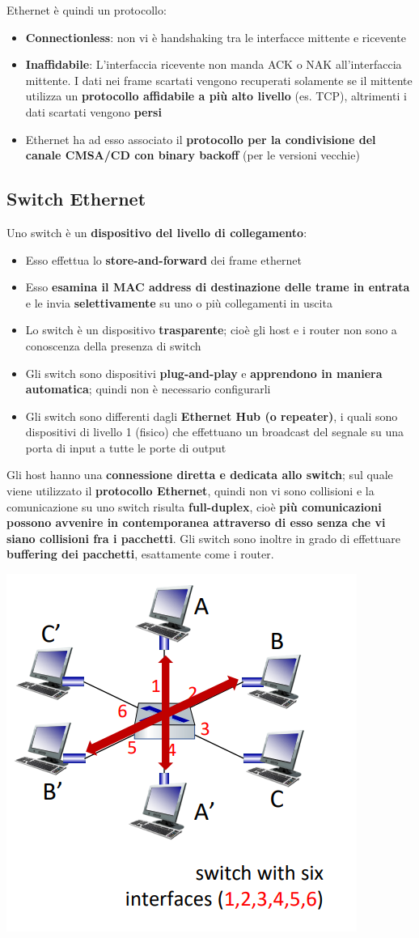 \documentclass[12pt]{article}
\begin{document}
Ethernet è quindi un protocollo:
\begin{itemize}
    \item \textbf{Connectionless}: non vi è handshaking tra le interfacce mittente e ricevente
    \item \textbf{Inaffidabile}: L'interfaccia ricevente non manda ACK o NAK all'interfaccia mittente. I dati nei frame scartati vengono recuperati
    solamente se il mittente utilizza un \textbf{protocollo affidabile a più alto livello} (es. TCP), altrimenti i dati scartati vengono \textbf{persi}
    \item Ethernet ha ad esso associato il \textbf{protocollo per la condivisione del canale CMSA/CD con binary backoff} (per le versioni vecchie)
\end{itemize}
\subsection{Switch Ethernet}
Uno switch è un \textbf{dispositivo del livello di collegamento}:
\begin{itemize}
    \item Esso effettua lo \textbf{store-and-forward} dei frame ethernet
    \item Esso \textbf{esamina il MAC address di destinazione delle trame in entrata} e le invia \textbf{selettivamente} su uno o più collegamenti in uscita
    \item Lo switch è un dispositivo \textbf{trasparente}; cioè gli host e i router non sono a conoscenza della presenza di switch
    \item Gli switch sono dispositivi \textbf{plug-and-play} e \textbf{apprendono in maniera automatica}; quindi non è necessario configurarli
    \item Gli switch sono differenti dagli \textbf{Ethernet Hub (o repeater)}, i quali sono dispositivi di livello 1 (fisico) che effettuano un broadcast del segnale su una porta di input a tutte le porte di output
\end{itemize}
Gli host hanno una \textbf{connessione diretta e dedicata allo switch}; sul quale viene utilizzato il \textbf{protocollo Ethernet}, quindi non vi sono collisioni e la comunicazione su uno switch risulta \textbf{full-duplex}, cioè \textbf{più comunicazioni possono avvenire in contemporanea attraverso di esso senza che vi siano collisioni fra i pacchetti}.
Gli switch sono inoltre in grado di effettuare \textbf{buffering dei pacchetti}, esattamente come i router.  
\begin{center}
    \includegraphics[width =0.40\linewidth]{Images/138.png}
\end{center}
\end{document}
